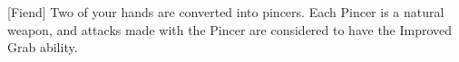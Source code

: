  {[Fiend]}
\shortfeat
{Two of your hands are converted into pincers.}
{Each Pincer is a natural weapon, and attacks made with the Pincer are considered to have the Improved Grab ability.}